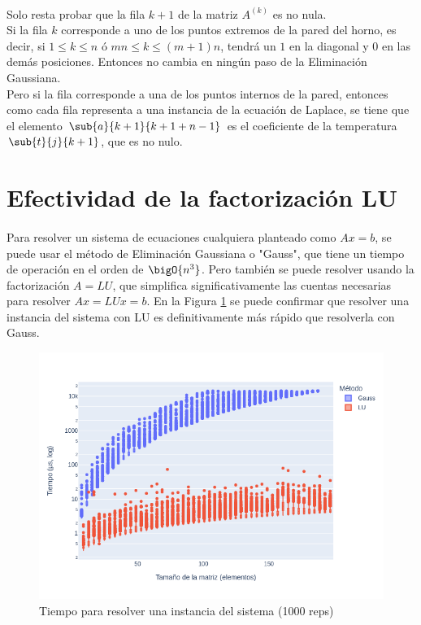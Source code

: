 \documentclass[12pt]{article}
\begin{document}
\begin{itemize}
\paragraph{} Solo resta probar que la fila \(k+1\) de la matriz \(A^{(k)}\) es no nula. \\
Si la fila $k$ corresponde a uno de los puntos extremos de la pared del horno, es decir, si \(1 \leq k \leq n \text{ ó } mn \leq k \leq (m+1)n\), tendrá un $1$ en la diagonal y $0$ en las demás posiciones. Entonces no cambia en ningún paso de la Eliminación Gaussiana. \\
Pero si la fila corresponde a una de los puntos internos de la pared, entonces como cada fila representa a una instancia de la ecuación de Laplace, se tiene que el elemento \(\sub{a}{k+1}{k+1+n-1}\) es el coeficiente de la temperatura \(\sub{t}{j}{k+1}\), que es no nulo. 

\end{itemize}

\section{Efectividad de la factorización LU}

\paragraph{} Para resolver un sistema de ecuaciones cualquiera planteado como \(Ax = b\), se puede usar el método de Eliminación Gaussiana o "Gauss", que tiene un tiempo de operación en el orden de \(\bigO{n^3}\). Pero también se puede resolver usando la factorización \(A = LU\), que simplifica significativamente las cuentas necesarias para resolver \(Ax = LUx = b\).
En la Figura \ref{fig:solve.time} se puede confirmar que resolver una instancia del sistema con LU es definitivamente más rápido que resolverla con Gauss. 

\begin{figure}[H]
\centering
\includegraphics[scale=0.5]{times.1.t_solve}
\caption{Tiempo para resolver una instancia del sistema (1000 reps)}
\label{fig:solve.time}
\end{figure}
\end{document}

